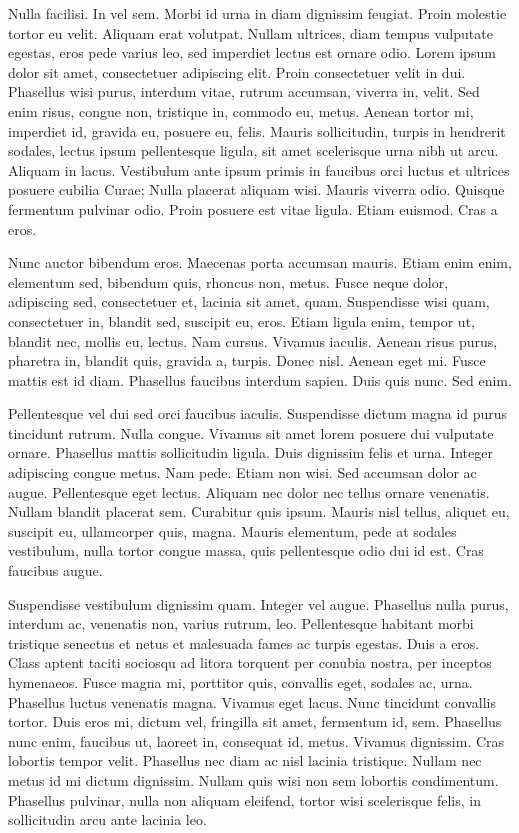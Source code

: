 Nulla facilisi. In vel sem. Morbi id urna in diam dignissim feugiat. Proin molestie tortor eu velit. Aliquam erat volutpat. Nullam ultrices, diam tempus vulputate egestas, eros pede varius leo, sed imperdiet lectus est ornare odio. Lorem ipsum dolor sit amet, consectetuer adipiscing elit. Proin consectetuer velit in dui. Phasellus wisi purus, interdum vitae, rutrum accumsan, viverra in, velit. Sed enim risus, congue non, tristique in, commodo eu, metus. Aenean tortor mi, imperdiet id, gravida eu, posuere eu, felis. Mauris sollicitudin, turpis in hendrerit sodales, lectus ipsum pellentesque ligula, sit amet scelerisque urna nibh ut arcu. Aliquam in lacus. Vestibulum ante ipsum primis in faucibus orci luctus et ultrices posuere cubilia Curae; Nulla placerat aliquam wisi. Mauris viverra odio. Quisque fermentum pulvinar odio. Proin posuere est vitae ligula. Etiam euismod. Cras a eros.

Nunc auctor bibendum eros. Maecenas porta accumsan mauris. Etiam enim enim, elementum sed, bibendum quis, rhoncus non, metus. Fusce neque dolor, adipiscing sed, consectetuer et, lacinia sit amet, quam. Suspendisse wisi quam, consectetuer in, blandit sed, suscipit eu, eros. Etiam ligula enim, tempor ut, blandit nec, mollis eu, lectus. Nam cursus. Vivamus iaculis. Aenean risus purus, pharetra in, blandit quis, gravida a, turpis. Donec nisl. Aenean eget mi. Fusce mattis est id diam. Phasellus faucibus interdum sapien. Duis quis nunc. Sed enim.

Pellentesque vel dui sed orci faucibus iaculis. Suspendisse dictum magna id purus tincidunt rutrum. Nulla congue. Vivamus sit amet lorem posuere dui vulputate ornare. Phasellus mattis sollicitudin ligula. Duis dignissim felis et urna. Integer adipiscing congue metus. Nam pede. Etiam non wisi. Sed accumsan dolor ac augue. Pellentesque eget lectus. Aliquam nec dolor nec tellus ornare venenatis. Nullam blandit placerat sem. Curabitur quis ipsum. Mauris nisl tellus, aliquet eu, suscipit eu, ullamcorper quis, magna. Mauris elementum, pede at sodales vestibulum, nulla tortor congue massa, quis pellentesque odio dui id est. Cras faucibus augue.

Suspendisse vestibulum dignissim quam. Integer vel augue. Phasellus nulla purus, interdum ac, venenatis non, varius rutrum, leo. Pellentesque habitant morbi tristique senectus et netus et malesuada fames ac turpis egestas. Duis a eros. Class aptent taciti sociosqu ad litora torquent per conubia nostra, per inceptos hymenaeos. Fusce magna mi, porttitor quis, convallis eget, sodales ac, urna. Phasellus luctus venenatis magna. Vivamus eget lacus. Nunc tincidunt convallis tortor. Duis eros mi, dictum vel, fringilla sit amet, fermentum id, sem. Phasellus nunc enim, faucibus ut, laoreet in, consequat id, metus. Vivamus dignissim. Cras lobortis tempor velit. Phasellus nec diam ac nisl lacinia tristique. Nullam nec metus id mi dictum dignissim. Nullam quis wisi non sem lobortis condimentum. Phasellus pulvinar, nulla non aliquam eleifend, tortor wisi scelerisque felis, in sollicitudin arcu ante lacinia leo.

